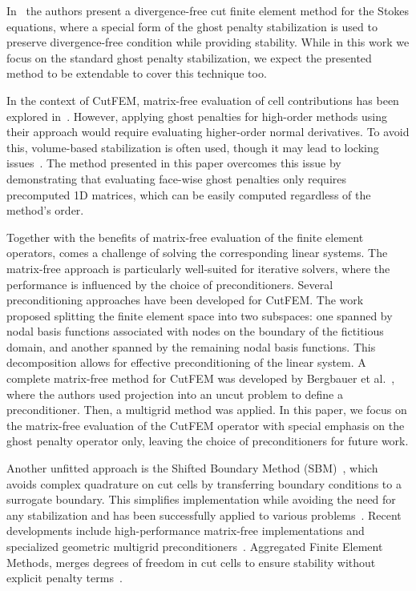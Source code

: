 \documentclass[11pt,a4paper]{article}
\begin{document}
In~\cite{frachon2024divergence} the authors present a divergence-free cut finite element method for the Stokes
equations, where a special form of the ghost penalty stabilization is used to preserve divergence-free condition while
providing stability. While in this work we focus on the standard ghost penalty stabilization, we expect the presented
method to be extendable to cover this technique too.

In the context of CutFEM, matrix-free evaluation of cell contributions has been explored in~\cite{bergbauer2024high}.
However, applying ghost penalties for high-order methods using their approach would require evaluating higher-order
normal derivatives. To avoid this, volume-based stabilization is often used, though it may lead to locking
issues~\cite{burman2022design}. The method presented in this paper overcomes this issue by demonstrating that
evaluating face-wise ghost penalties only requires precomputed 1D matrices, which can be easily computed regardless of
the method's order.

Together with the benefits of matrix-free evaluation of the finite element operators, comes a challenge of solving the
corresponding linear systems. The matrix-free approach is particularly well-suited for iterative solvers, where the
performance is influenced by the choice of preconditioners. Several preconditioning approaches have been developed for
CutFEM. The work~\cite{gross2021optimal, gross2023analysis} proposed splitting the finite element space into two
subspaces: one spanned by nodal basis functions associated with nodes on the boundary of the fictitious domain, and
another spanned by the remaining nodal basis functions. This decomposition allows for effective preconditioning of the
linear system. A complete matrix-free method for CutFEM was developed by Bergbauer et al.~\cite{bergbauer2024high},
where the authors used projection into an uncut problem to define a preconditioner. Then, a multigrid method was
applied. In this paper, we focus on the matrix-free evaluation of the CutFEM operator with special emphasis on the
ghost penalty operator only, leaving the choice of preconditioners for future work.

Another unfitted approach is the Shifted Boundary Method (SBM)~\cite{main2018shifted, atallah2020second}, which avoids
complex quadrature on cut cells by transferring boundary conditions to a surrogate boundary. This simplifies
implementation while avoiding the need for any stabilization and has been successfully applied to various
problems~\cite{atallah2021shifted}. Recent developments include high-performance matrix-free implementations and
specialized geometric multigrid preconditioners~\cite{wichrowski2025matrix, wichrowski2025geometric,
    wichrowski2026sbmMGCG}. Aggregated Finite Element Methods, merges degrees of freedom in cut cells to ensure stability
without explicit penalty terms~\cite{badia2018mixed, badia2021aggregated}.
\end{document}
